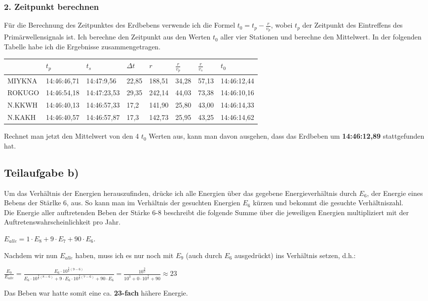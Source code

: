 \documentclass{article}
\begin{document}
\subsubsection*{2. Zeitpunkt berechnen}
Für die Berechnung des Zeitpunktes des Erdbebens verwende ich die Formel 
$t_0 = t_p - \frac{r}{v_p}$, 
wobei $t_p$ der Zeitpunkt des Eintreffens des Primärwellensignals ist. 
Ich berechne den Zeitpunkt aus den Werten $t_0$ aller vier Stationen und berechne den Mittelwert. 
In der folgenden Tabelle habe ich die Ergebnisse zusammengetragen.
\begin{center}
\begin{tabular}{l|l|l|l|l|l|l|l}
		   & $t_{p}$         & $t_s$         & $\Delta t$ & $r$      & $\frac{r}{v_p}$    & $\frac{r}{v_s}$    & $t_0$          \\\hline
	MIYKNA & 14:46:46,71 & 14:47:9,56  & 22,85   & 188,51 & 34,28 & 57,13 & 14:46:12,44 \\
	ROKUGO & 14:46:54,18 & 14:47:23,53 & 29,35   & 242,14 & 44,03 & 73,38 & 14:46:10,16 \\
	N.KKWH & 14:46:40,13 & 14:46:57,33 & 17,2    & 141,90 & 25,80 & 43,00 & 14:46:14,33 \\
	N.KAKH & 14:46:40,57 & 14:46:57,87 & 17,3    & 142,73 & 25,95 & 43,25 & 14:46:14,62 
\end{tabular}
\end{center}
Rechnet man jetzt den Mittelwert von den 4 $t_0$ Werten aus, kann man davon ausgehen, 
dass das Erdbeben um \textbf{14:46:12,89} stattgefunden hat.


\subsection*{Teilaufgabe b)}
Um das Verhältnis der Energien herauszufinden, drücke ich alle Energien über das gegebene Energieverhältnis durch $E_6$, der Energie eines Bebens der Stärlke 6, aus. 
So kann man im Verhältnis der gesuchten Energien $E_6$ kürzen und bekommt die gesuchte Verhältniszahl.\\
Die Energie aller auftretenden Beben der Stärke 6-8 beschreibt die folgende Summe über die jeweiligen Energien multipliziert mit der Auftretenswahrscheinlichkeit pro Jahr. 
\begin{center}
$E_{alle} = 1 \cdot E_8 + 9 \cdot E_7 + 90 \cdot E_6$. 
\end{center}
Nachdem wir nun $E_{alle}$ haben, muss ich es nur noch mit $E_9$ (auch durch $E_6$ ausgedrückt) ins Verhältnis setzen, d.h.:
\begin{center}
$\frac{E_9}{E_{alle}} = \frac{E_6 \cdot 10^{\frac{3}{2} (9 - 6)}}{E_6 \cdot 10^{\frac{3}{2}(8-6)} + 9 \cdot E_6 \cdot 10^{\frac{3}{2}(7-6)} + 90 \cdot E_6}
= \frac{10^\frac{9}{2}}{10^3 + 0 \cdot 10^\frac{3}{2} + 90} \approx 23$
\end{center}
Das Beben war hatte somit eine ca. \textbf{23-fach} hähere Energie.\\
\end{document}

